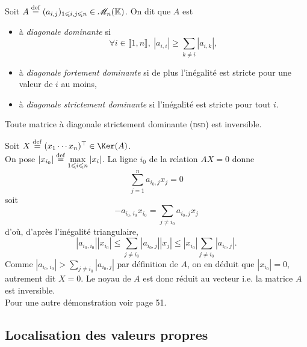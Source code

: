 \begin{defi}
    Soit $A \overset{\mathrm{\tiny def}}{=} (a_{i,j})_{1 \leqslant i, j \leqslant n} \in \mathscr{M}_n(\mathbb{K})$. On dit que $A$ est 
    \begin{itemize}
        \item à \emph{diagonale dominante} si
        $$\forall i \in \llbracket 1, n \rrbracket,\ |a_{i,i}| \geqslant \sum_{k \not = i} |a_{i,k}|,$$
        \item à \emph{diagonale fortement dominante} si de plus l'inégalité est stricte pour une valeur de $i$ au moins,
        \item à \emph{diagonale strictement dominante} si l'inégalité est stricte pour tout $i$. 
    \end{itemize}
\end{defi}

\begin{lemme} \label{lemme_hadamard}
    Toute matrice à diagonale strictement dominante (\textsc{dsd}) est inversible.
\end{lemme}


\begin{demo}
    Soit $X \defeq \Trsp{(x_1 \cdots x_n)} \in \Ker(A)$. \\
    On pose $\displaystyle \left |x_{i_0} \right| \overset{\mathrm{\tiny def}}{=} \max_{1 \leqslant i \leqslant n} |x_i|$. La ligne $i_0$ de la relation $AX = 0$ donne
    $$\sum_{j=1}^n a_{i_0,j}x_j = 0$$
    soit
    $$-a_{i_0, i_0} x_{i_0} = \sum_{j \not = i_0} a_{i_0,j} x_j$$
    d'où, d'après l'inégalité triangulaire,
    $$|a_{i_0, i_0}| |x_{i_0}| \leqslant \sum_{j \not = i_0} |a_{i_0,j}| |x_j| \leqslant |x_{i_0}| \sum_{j \not = i_0} |a_{i_0, j}|.$$
    Comme $|a_{i_0, i_0}| > \sum\limits_{j \not = i_0} |a_{i_0, j}|$ par définition de $A$, on en déduit que
    $|x_{i_0}| = 0$, autrement dit $X = 0$. Le noyau de $A$ est donc réduit au vecteur i.e. la matrice $A$ est inversible. \\
    Pour une autre démonstration voir \cite{matrices} page 51. 
\end{demo}

\subsection{Localisation des valeurs propres}

